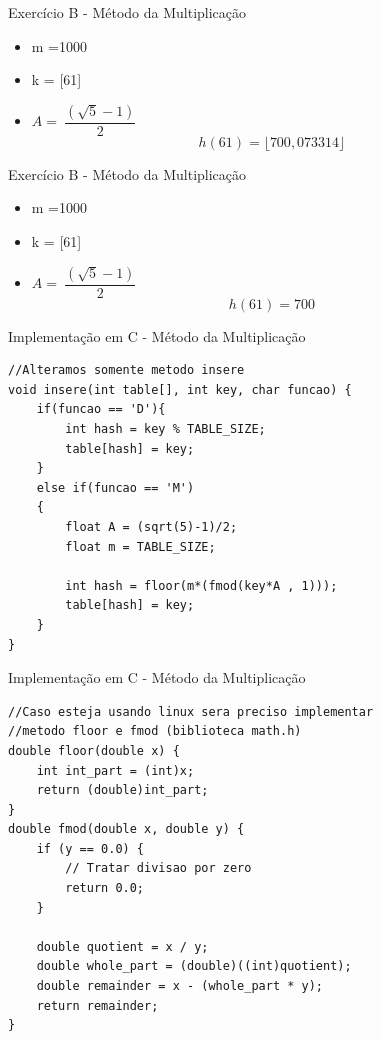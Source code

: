 \documentclass{beamer}
\begin{document}
\begin{frame}{Exercício B - Método da Multiplicação}
\begin{itemize}
 \item m =1000
 \item k = [61]
 \item $A = \ \dfrac{(\sqrt{5}-1)}{2}$ 
 $$h(61) = \lfloor 700,073314\rfloor$$  
\end{itemize}
\end{frame}

\begin{frame}{Exercício B - Método da Multiplicação}

\begin{itemize}
 \item m =1000
 \item k = [61]
 \item $A = \ \dfrac{(\sqrt{5}-1)}{2}$ 
 $$h(61) = 700$$  
\end{itemize}
\end{frame}

\begin{frame}[fragile]{Implementação em C - Método da Multiplicação}
\footnotesize
\begin{lstlisting}[style=CStyle]
//Alteramos somente metodo insere
void insere(int table[], int key, char funcao) {
    if(funcao == 'D'){
        int hash = key % TABLE_SIZE;
        table[hash] = key;
    }
    else if(funcao == 'M')
    {
        float A = (sqrt(5)-1)/2;
        float m = TABLE_SIZE;

        int hash = floor(m*(fmod(key*A , 1)));
        table[hash] = key;
    }
}

\end{lstlisting}
\end{frame}

\begin{frame}[fragile]{Implementação em C - Método da Multiplicação}
\footnotesize
\begin{lstlisting}[style=CStyle]
//Caso esteja usando linux sera preciso implementar
//metodo floor e fmod (biblioteca math.h)
double floor(double x) {
    int int_part = (int)x;
    return (double)int_part;
}
double fmod(double x, double y) {
    if (y == 0.0) {
        // Tratar divisao por zero
        return 0.0;
    }

    double quotient = x / y;
    double whole_part = (double)((int)quotient);
    double remainder = x - (whole_part * y);
    return remainder;
}

\end{lstlisting}
\end{frame}
\end{document}
